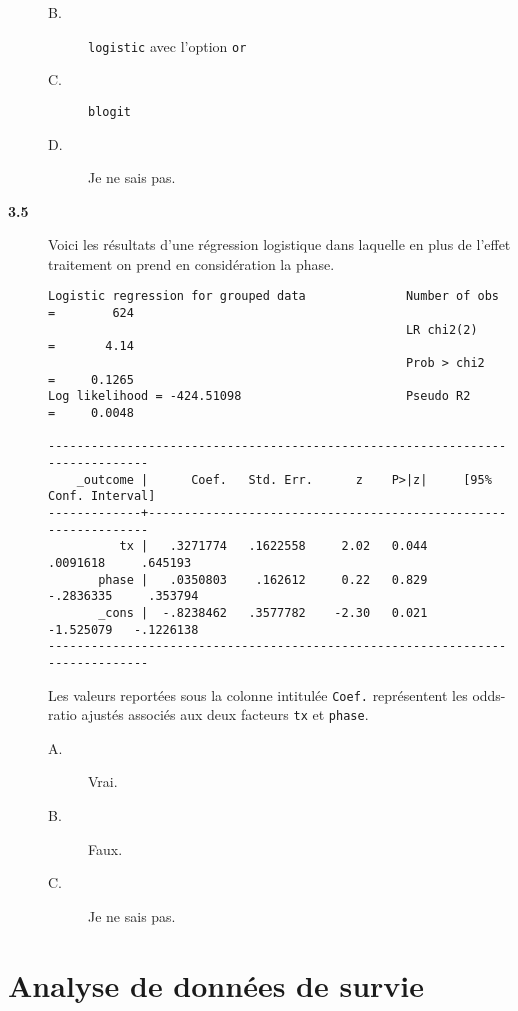 \begin{description}
\begin{description}
\item[B.] \verb|logistic| avec l'option \texttt{or}
\item[C.] \verb|blogit|
\item[D.] Je ne sais pas.
\end{description}
\item[\bf 3.5] Voici les résultats d'une régression logistique dans laquelle
  en plus de l'effet traitement on prend en considération la
  phase.  
\begin{verbatim}
Logistic regression for grouped data              Number of obs   =        624
                                                  LR chi2(2)      =       4.14
                                                  Prob > chi2     =     0.1265
Log likelihood = -424.51098                       Pseudo R2       =     0.0048

------------------------------------------------------------------------------
    _outcome |      Coef.   Std. Err.      z    P>|z|     [95% Conf. Interval]
-------------+----------------------------------------------------------------
          tx |   .3271774   .1622558     2.02   0.044     .0091618     .645193
       phase |   .0350803    .162612     0.22   0.829    -.2836335     .353794
       _cons |  -.8238462   .3577782    -2.30   0.021    -1.525079   -.1226138
------------------------------------------------------------------------------
\end{verbatim}
Les valeurs reportées sous la colonne intitulée \texttt{Coef.} représentent
les odds-ratio ajustés associés aux deux facteurs \texttt{tx} et \texttt{phase}.
\begin{description}
\item[A.] Vrai.
\item[B.] Faux.
\item[C.] Je ne sais pas.
\end{description}
\end{description}


\chapter{Analyse de données de survie}

